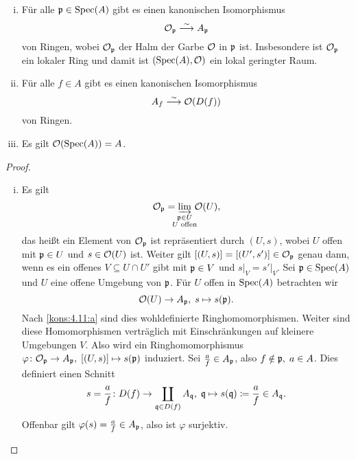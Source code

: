\begin{prop}
\label{prop:4.12}
	\begin{enumerate}[i)]
		\item Für alle $\mathfrak{p} \in \operatorname{Spec}(A)$ gibt es einen kanonischen Isomorphismus
		\[
			\mathcal{O}_{\mathfrak{p}} \overset{\sim}{\longrightarrow} A_{\mathfrak{p}}
		\]
		von Ringen, wobei $\mathcal{O}_{\mathfrak{p}}$ der Halm der Garbe $\mathcal{O}$ in $\mathfrak{p}$ ist. Insbesondere ist $\mathcal{O}_{\mathfrak{p}}$ ein lokaler Ring und damit ist $(\operatorname{Spec}(A),\mathcal{O})$ ein lokal geringter Raum.
		\item Für alle $f \in A$ gibt es einen kanonischen Isomorphismus
		\[
			A_f \overset{\sim}{\longrightarrow}\mathcal{O}(D(f))
		\]
		von Ringen.
		\item Es gilt $\mathcal{O}(\operatorname{Spec}(A)) = A$.
	\end{enumerate}
	\begin{proof}
		\begin{enumerate}[i)]
			\item Es gilt
			\[
				\mco_\mfp = \varinjlim_{\substackclap{\mfp \in U\\U \text{ offen}}} \, \mco(U),
			\]
			das heißt ein Element von $\mathcal{O}_{\mathfrak{p}}$ ist repräsentiert durch $(U,s)$, wobei $U$ offen mit $\mathfrak{p} \in U$ und $s \in \mathcal{O}(U)$ ist. Weiter gilt $[(U,s)] = [(U',s')] \in \mathcal{O}_{\mathfrak{p}}$ genau dann, wenn es ein offenes $V \subseteq U \cap U'$ gibt mit $\mathfrak{p} \in V$ und $s\vert_V = s'\vert_V$. Sei $\mathfrak{p} \in \operatorname{Spec}(A)$ und $U$ eine offene Umgebung von $\mathfrak{p}$. Für $U$ offen in $\operatorname{Spec}(A)$ betrachten wir
			\[
			 	\mathcal{O}(U) \to A_{\mathfrak{p}},\; s \mapsto s(\mathfrak{p}).
			\]
			Nach \ref{kons:4.11:a} sind dies wohldefinierte Ringhomomorphismen. Weiter sind diese Homomorphismen verträglich mit Einschränkungen auf kleinere Umgebungen $V$. Also wird ein Ringhomomorphismus $\varphi\colon\mathcal{O}_{\mathfrak{p}} \to A_{\mathfrak{p}},\; [(U,s)] \mapsto s(\mathfrak{p})$ induziert.
			Sei $\frac{a}{f}\in A_{\mathfrak{p}}$, also $f \notin \mathfrak{p},\; a \in A$. Dies definiert einen Schnitt
			\[
				s = \frac{a}{f}\colon D(f) \to \coprod_{\mathfrak{q} \in D(f)} A_{\mathfrak{q}},\; \mathfrak{q} \mapsto s(\mathfrak{q}) \coloneqq \frac{a}{f} \in A_{\mathfrak{q}}.
			\]
			Offenbar gilt $\varphi(s) = \frac{a}{f}\in A_{\mathfrak{p}}$, also ist $\varphi$ surjektiv.


\end{enumerate}
\end{proof}
\end{prop}
